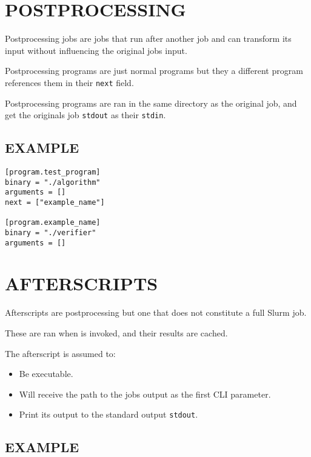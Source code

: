 \documentclass[a4paper,english]{article}
\begin{document}
\begin{adjustwidth}{18pt}{0pt}
    \section{POSTPROCESSING}

        Postprocessing jobs are jobs that run after another job and
        can transform its input without influencing the original jobs input.

        Postprocessing programs are just normal programs but they a different
        program references them in their \texttt{next} field.

        Postprocessing programs are ran in the same directory as the original
        job, and get the originals job \texttt{stdout} as their \texttt{stdin}.

        \subsection{EXAMPLE}

            \begin{verbatim}
[program.test_program]
binary = "./algorithm"
arguments = []
next = ["example_name"]

[program.example_name]
binary = "./verifier"
arguments = []
            \end{verbatim}

    \section{AFTERSCRIPTS}

        Afterscripts are postprocessing but one that does not constitute
        a full Slurm job.

        These are ran when   is invoked, and their results are
        cached.

        The afterscript is assumed to:

        \begin{itemize}
            \item Be executable.
            \item Will receive the path to the jobs output as the first CLI parameter.
            \item Print its output to the standard output \texttt{stdout}.
        \end{itemize}

        \subsection{EXAMPLE}


\end{adjustwidth}
\end{document}
